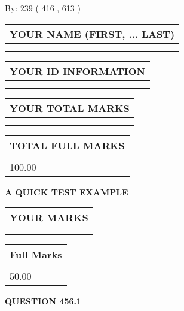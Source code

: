 \documentclass[12pt]{article}
\begin{document}
   
\hspace{1.0in} By: 
 239 ( 416 ,  613 )
   
   
   
   
\newpage 
\setcounter{page}{ 
   456001 } 
   
   
   
   
\noindent\begin{tabular}{|l|}
\hline
YOUR NAME (FIRST, ... LAST)  \\
\hline
 \\ 
 \\ 
\hline
\end{tabular}
\hspace{0.05in} \begin{tabular}{|l|}
\hline
 YOUR   ID   INFORMATION  \\
\hline
 \\ 
 \\ 
\hline
\end{tabular}
   
   
\vspace{0.2in}\noindent\begin{tabular}{|l|}
\hline
YOUR TOTAL MARKS  \\
\hline
 \\ 
 \\ 
\hline
\end{tabular}
\hspace{0.05in} \begin{tabular}{|l|}
\hline
TOTAL FULL MARKS  \\
\hline
 \\ 
100.00 \\
\hline
\end{tabular}
   
   
 \vspace{0.2in}
{\LARGE {\textbf{ A QUICK TEST EXAMPLE}}}
   
   
  
\vspace{0.2in}
  
\noindent\begin{tabular}{|l|}
\hline
 YOUR MARKS  \\
\hline
 \\ 
 \\ 
\hline
\end{tabular}
\hspace{0.05in} \begin{tabular}{|l|}
\hline
 Full Marks  \\
\hline
 \\ 
50.00 \\
\hline
\end{tabular}
{\textbf{\Large{QUESTION
456.1 
}}}
  
\end{document}
